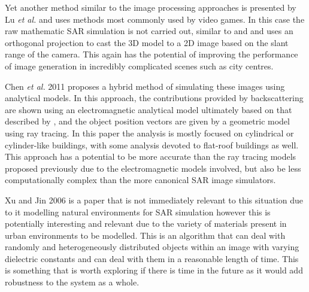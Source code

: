 Yet another method similar to the image processing approaches is presented by Lu \textit{et al.} \cite{luGPUBasedRealtime2009} and uses methods most commonly used by video games. In this case the raw mathematic SAR simulation is not carried out, similar to \cite{balzHybridGPUBasedSingle2009} and \cite{auerRayTracingSimulating2008} and uses an orthogonal projection to cast the 3D model to a 2D image based on the slant range of the camera. This again has the potential of improving the performance of image generation in incredibly complicated scenes such as city centres.
\par 
Chen \textit{et al.} 2011 \cite{chenRadarImagingSimulation2011} proposes a hybrid method of simulating these images using analytical models. In this approach, the contributions provided by backscattering are shown using an electromagnetic analytical model ultimately based on that described by \cite{franceschettiSARRawSignal2003}, and the object position vectors are given by a geometric model using ray tracing. In this paper the analysis is mostly focused on cylindrical or cylinder-like buildings, with some analysis devoted to flat-roof buildings as well. This approach has a potential to be more accurate than the ray tracing models proposed previously due to the electromagnetic models involved, but also be less computationally complex than the more canonical SAR image simulators. 
\par
Xu and Jin 2006 \cite{xuImagingSimulationPolarimetric2006} is a paper that is not immediately relevant to this situation due to it modelling natural environments for SAR simulation however this is potentially interesting and relevant due to the variety of materials present in urban environments to be modelled. This is an algorithm that can deal with randomly and heterogeneously distributed objects within an image with varying dielectric constants and can deal with them in a reasonable length of time. This is something that is worth exploring if there is time in the future as it would add robustness to the system as a whole. 






